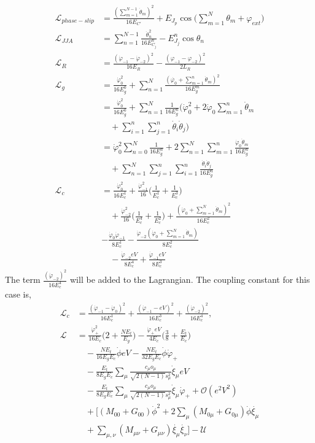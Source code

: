 \documentclass[%
reprint,
superscriptaddress,
 amsmath,amssymb,
 aps,
 prx,
longbibliography,
floatfix,
]{revtex4-2}
\begin{document}
  \begin{align}
    \mathcal{L}_{phase-slip}&=\frac{(\sum_{m=1}^{N-1}\dot\theta_m)^2}{16E_{C'}}+E_{J_p}\cos\big(\sum_{m=1}^N\theta_m+\varphi_{ext}\big)\\
    \mathcal{L}_{JJA}&=\sum_{n=1}^{N-1}\frac{\dot{\theta}_n^2}{16E^{n}_{C_j}}-E^{n}_{J_j}\cos{\theta_n}\\
    \mathcal{L}_{R}&=\frac{(\dot{\varphi}_{-1}-\dot{\varphi}_{-2})^2}{16E_{{R}}}-\frac{(\varphi_{-1}-\varphi_{-2})^2}{2L_{R}}\\
    \mathcal{L}_{g}&=\frac{\dot{\varphi}_0^2}{16E^0_{g}}+\sum_{n=1}^N \frac{(\dot{\varphi_0}+\sum_{m=1}^n\dot{\theta}_m)^2}{16E^m_{g}}\\
    &=\frac{\dot{\varphi}_0^2}{16E^0_{g}}+\sum_{n=1}^N \frac{1}{16E^n_{g}}(\dot{\varphi}_0^2+2\dot{\varphi}_0\sum_{m=1}^n\dot{\theta}_m\nonumber\\&\quad+\sum_{i=1}^n\sum_{j=1}^{n}\dot{\theta}_i\dot{\theta}_j)\\
    &=\dot{\varphi}_0^2\sum_{n=0}^N\frac{1}{16E^n_g}+2\sum_{n=1}^N\sum_{m=1}^n\frac{\dot{\varphi}_0\dot{\theta}_m}{16E^n_{g}}\nonumber\\&\quad+\sum_{n=1}^N\sum_{j=1}^n\sum_{i=1}^{n}\frac{\dot{\theta}_i\dot{\theta}_j}{16E^n_{g}}\\
    \mathcal{L}_{c}&=\frac{\dot{\varphi}^2_0}{16E^1_c}+\frac{\dot{\varphi}^2_{-1}}{16}\Big(\frac{1}{E^1_c}+\frac{1}{E^3_c}\Big)\nonumber\\
    &\quad+\frac{\dot{\varphi}^2_{-2}}{16}\Big(\frac{1}{E^4_c}+\frac{1}{E^2_c}\Big)+\frac{(\dot{\varphi}_0+\sum_{m=1}^N\dot{\theta}_m)^2}{16E^2_c}\nonumber\\
  &-\frac{\dot{\varphi}_0\dot{\varphi}_{-1}}{8E^1_c}-\frac{\dot{\varphi}_{-2}(\dot{\varphi}_{0}+\sum_{m=1}^N\dot{\theta}_m)}{8E^2_c}\nonumber\\
    &\quad-\frac{\dot{\varphi}_{-2}eV}{8E^4_c}+\frac{\dot{\varphi}_{-1}eV}{8E^3_c}
\end{align}
The term $\frac{(\dot{\varphi}_{-2})^2}{16E^4_{c}}$ will be added to the Lagrangian. The coupling constant for this case is,
\begin{align}
    \mathcal{L}_{c}&=\frac{(\dot{\varphi}_{-1}-\dot{\varphi}_{0})^2}{16E^1_{c}}+\frac{(\dot{\varphi}_{-1}-eV)^2}{16E^3_{c}}+\frac{(\dot{\varphi}_{-2})^2}{16E^4_{c}},\\
 \mathcal{L}&=\frac{\dot{\varphi}_{+}^2}{16E_c}\Big(2+\frac{NE_t}{E_g}\Big)-\frac{\dot{\varphi}_{+}eV}{4E_c}\Big(\frac{3}{8}+\frac{E_t}{E_c}\Big)\nonumber\\
    &\quad-\frac{NE_t}{16E_gE_c}\dot{\phi}eV-\frac{NE_t}{32E_gE_c}\dot{\phi}\dot{\varphi}_{+}\\
    &\quad -\frac{E_t}{8E_gE_c} \sum_\mu\frac{c_\mu o_\mu}{\sqrt{2(N-1)}s_\mu^2}  \dot{\xi}_\mu eV\nonumber\\
    &\quad-\frac{E_t}{8E_gE_c} \sum_\mu\frac{c_\mu o_\mu}{\sqrt{2(N-1)}s_\mu^2}  \dot{\xi}_\mu\dot{\varphi}_{+}+\mathcal{O}(e^2V^2)\\
    &\quad+\Big[(M_{00}+G_{00})\dot{\phi}^2+2\sum_{\mu}(M_{0\mu}+G_{0\mu})\dot{\phi}\dot{\xi_\mu}\nonumber\\
    &\quad+\sum_{\mu,\nu}(M_{\mu\nu}+G_{\mu\nu})\dot{\xi_\mu}\dot{\xi_\nu}\Big]-\mathcal{U}
\end{align}
\end{document}

